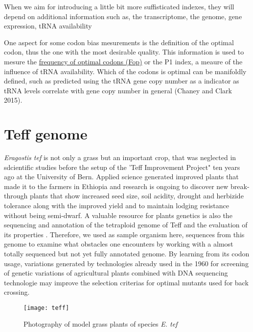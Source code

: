 When we aim for introducing a little bit more suffisticated indexes, they will depend on additional information such as, the transcriptome, the genome, gene expression, tRNA availability

One aspect for some codon bias mesurements is the definition of the optimal codon, thus the one with the most desirable quality. This information is used to mesure the \hyperlink{function:Fop}{frequency of optimal codons (Fop)} or the P1 index, a meaure of the influence of tRNA availability. Which of the codons is optimal can be manifoldly defined, such as predicted using the tRNA gene copy number as a indicator as tRNA levels correlate with gene copy number in general \cite{Chaney2015}(Chaney and Clark 2015).

\section{Teff genome}
\textit{Eragostis tef} is not only a grass but an important crop, that was neglected in sdcientific studies before the setup of the 'Teff Improvement Project" ten years ago at the University of Bern. Applied science generated improved plants that made it to the farmers in Ethiopia and research is ongoing to discover new break-through plants that show increased seed size, soil acidity, drought and herbizide tolerance along with the improved yield and to maintain lodging resistance without being semi-dwarf. A valuable resource for plants genetics is also the sequencing and annotation of the tetraploid genome of Teff and the evaluation of its properties \cite{cannarozzi2014genome}. Therefore, we used as sample organism here, sequences from this genome to examine what obstacles one encounters by working with a almost totally sequenced but not yet fully annotated genome. By learning from its codon usage, variations generated by technologies already used in the 1960 for screening of genetic variations of agricultural plants combined with DNA sequencing technologie may improve the selection criterias for optimal mutants used for back crossing. 

\begin{figure}[tb] 
\centering 
\texttt{[image: teff]} 
\caption[\textit{Eragostis tef} growing in culture room]{Photography of model grass plants of species \textit{E. tef}}
\label{fig:teff} 
\end{figure}


